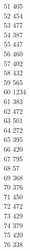{ 51	405 \\
 52	454 \\
 53	477 \\
 54	387 \\
 55	447 \\
 56	460 \\
 57	402 \\
 58	432 \\
 59	565 \\
 60	1234 \\
 61	383 \\
 62	472 \\
 63	501 \\
 64	272 \\
 65	395 \\
 66	420 \\
 67	795 \\
 68	57 \\
 69	368 \\
 70	376 \\
 71	450 \\
 72	472 \\
 73	429 \\
 74	379 \\
 75	420 \\
 76	338 \\
}
